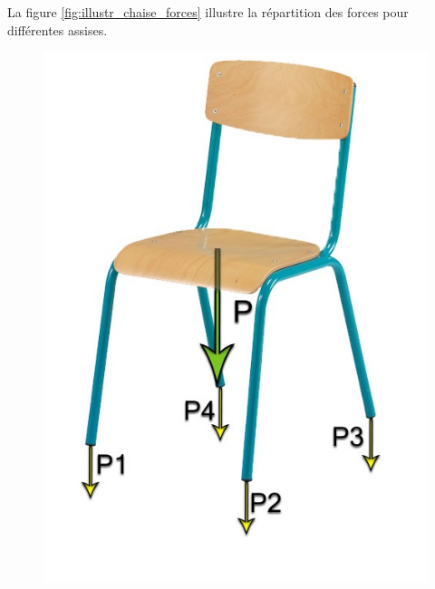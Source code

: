 \documentclass{polytech/polytech}
\begin{document}
La figure \ref{fig:illustr_chaise_forces}  illustre la répartition des forces pour différentes assises.

\begin{figure}[htbp]
\begin{center}
\includegraphics[scale=1]{image/Chaise_forces_homo.jpg}

\end{center}
\end{figure}
\end{document}
